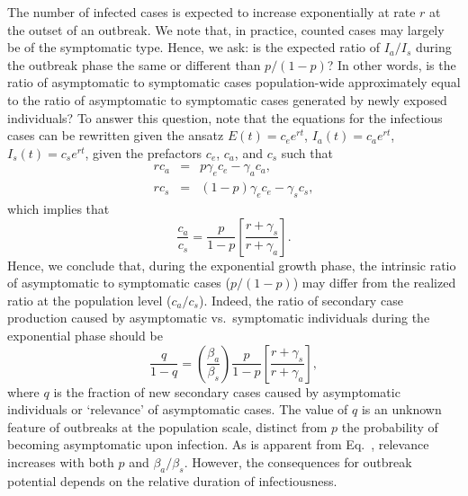 The number of infected cases is expected
to increase exponentially at rate $r$ at the outset of an outbreak.  We note
that, in practice,
counted cases may largely be of the symptomatic type. 
Hence, we ask: is the expected ratio of $I_a/I_s$ 
during the outbreak phase the same or different
than $p/(1-p)$?  In other words, is the ratio of asymptomatic to symptomatic cases population-wide approximately equal to the ratio of asymptomatic to symptomatic cases generated by newly exposed individuals?
To answer this question, note that the equations
for the infectious cases can be rewritten given the ansatz
$E(t)=c_e e^{rt}$,
$I_a(t)=c_a e^{rt}$,
$I_s(t)=c_s e^{rt}$,
given the prefactors $c_e$, $c_a$, and $c_s$
such that
\begin{eqnarray}
r c_a&=&p\gamma_e c_e-\gamma_a c_a,\\
r c_s&=&(1-p)\gamma_e c_e-\gamma_s c_s,
\end{eqnarray} 
which implies that
\begin{equation}
\frac{c_a}{c_s}=\frac{p}{1-p}\left[\frac{r+\gamma_s}{r+\gamma_a}\right].
\label{eq.relevance}
\end{equation}
Hence, we conclude that, during the exponential
growth phase, the intrinsic
ratio of asymptomatic to symptomatic cases ($p/(1-p)$) may differ from
the realized ratio at the population level ($c_a/c_s$).  
Indeed, the ratio of secondary case production caused by asymptomatic vs.~symptomatic
individuals during the exponential phase should be
\begin{equation}
\frac{q}{1-q} = \left(\frac{\beta_a}{\beta_s}\right)\frac{p}{1-p}\left[\frac{r+\gamma_s}{r+\gamma_a}\right],
\label{eq.qratio}
\end{equation}
where $q$ is the fraction of new secondary cases caused by
asymptomatic individuals or `relevance' of asymptomatic cases.
The value of $q$ is an unknown feature of
outbreaks at the population scale, distinct from $p$ the probability of becoming
asymptomatic upon infection. 
As is apparent from Eq.~, relevance increases
with both $p$ and $\beta_a/\beta_s$. However, the consequences
for outbreak potential depends on the relative duration of infectiousness.

